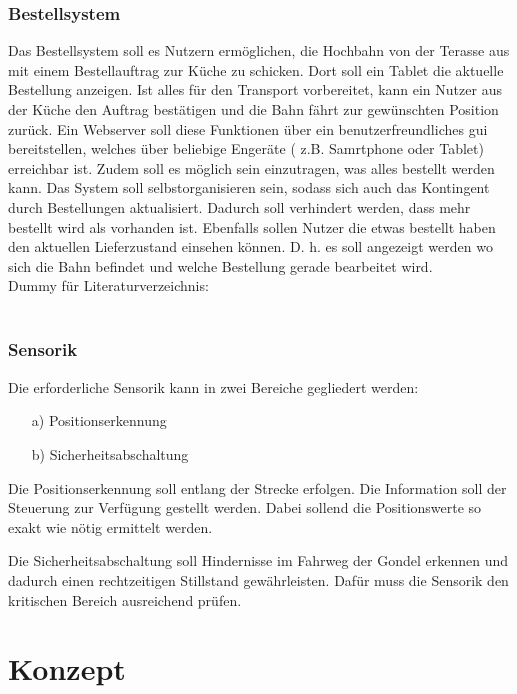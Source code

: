 \subsection{Bestellsystem}


Das Bestellsystem soll es Nutzern ermöglichen, die Hochbahn von der Terasse aus mit einem Bestellauftrag zur Küche zu schicken. 
Dort soll ein Tablet die aktuelle Bestellung anzeigen. Ist alles für den Transport vorbereitet, kann ein Nutzer aus der Küche den Auftrag 
bestätigen und die Bahn fährt zur gewünschten Position zurück. Ein Webserver soll diese Funktionen über ein benutzerfreundliches \acrfull{gui} bereitstellen, welches über beliebige Engeräte ( z.B. Samrtphone oder Tablet) erreichbar ist.
Zudem soll es möglich sein einzutragen, was alles bestellt werden kann. Das System soll selbstorganisieren sein, sodass sich auch das Kontingent durch Bestellungen aktualisiert. Dadurch soll verhindert werden, dass mehr bestellt wird als vorhanden ist.
Ebenfalls sollen Nutzer die etwas bestellt haben den aktuellen Lieferzustand einsehen können. D. h. es soll angezeigt werden wo sich die Bahn befindet und welche Bestellung gerade bearbeitet wird.
\\Dummy für Literaturverzeichnis:\\
\cite{knuth84}\\


\subsection{Sensorik}
Die erforderliche Sensorik kann in zwei Bereiche gegliedert werden: 

\begin{itemize}
	\item [a)] Positionserkennung 
	\item [b)] Sicherheitsabschaltung 
	
\end{itemize}

Die Positionserkennung soll entlang der Strecke erfolgen. Die Information soll der Steuerung zur Verfügung gestellt werden. Dabei sollend die Positionswerte so exakt wie nötig ermittelt werden.

Die Sicherheitsabschaltung soll Hindernisse im Fahrweg der Gondel erkennen und dadurch einen rechtzeitigen Stillstand gewährleisten. Dafür muss die Sensorik den kritischen Bereich ausreichend prüfen. 





\chapter{Konzept}
